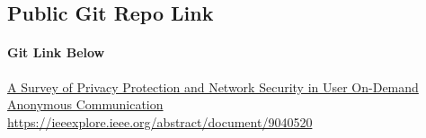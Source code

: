 \documentclass{article}
\begin{document}
    \subsection{Public Git Repo Link}
        \paragraph{Git Link Below}
        \hfill \break
        \href{
            https://ieeexplore.ieee.org/abstract/document/9040520
        }
            {A Survey of Privacy Protection and Network Security in User On-Demand Anonymous Communication}
            \\
        \url{https://ieeexplore.ieee.org/abstract/document/9040520}

\medskip
\printbibliography
\end{document}

